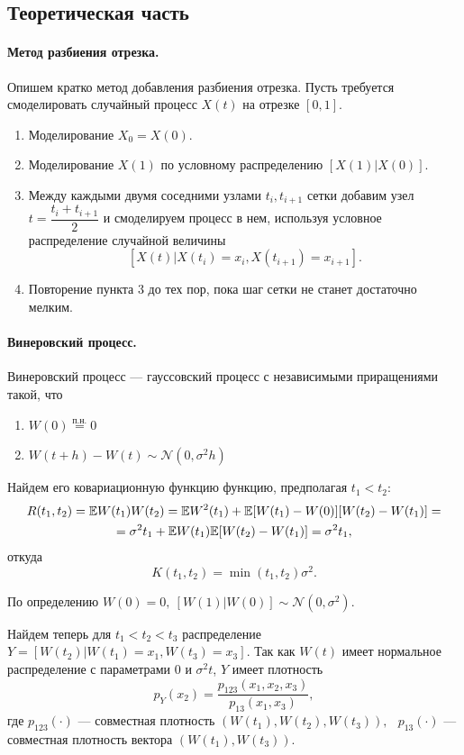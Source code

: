 \documentclass[16pt]{article}
\newcommand\A{(\cdot)}
\begin{document}
\subsection{Теоретическая часть}
\paragraph{Метод разбиения отрезка.}
Опишем кратко метод добавления разбиения отрезка. Пусть требуется смоделировать случайный процесс $X(t)$ на отрезке $[0, 1]$. 
\begin{enumerate}
	\item Моделирование $X_0 = X(0)$.
	\item Моделирование $X(1)$ по условному распределению $[X(1)|X(0)]$.
	\item Между каждыми двумя соседними узлами $t_i, t_{i + 1}$ сетки добавим узел $t = \dfrac{t_i + t_{i+1}}{2}$ и смоделируем процесс в нем, используя условное распределение случайной величины $$[X(t)|X(t_{i}) = x_i, X(t_{i+1}) = x_{i+1}].$$
	\item Повторение пункта 3 до тех пор, пока шаг сетки не станет достаточно мелким.
\end{enumerate}

\paragraph{Винеровский процесс.}
Винеровский процесс --- гауссовский процесс с независимыми приращениями такой, что
\begin{enumerate}
	\item $W(0) \overset{\text{п.н.}}{=} 0$
	\item $W(t + h) - W(t) \sim \mathcal{N}(0, \sigma^2h)$
\end{enumerate}

Найдем его ковариационную функцию функцию, предполагая $t_1 < t_2$:
\begin{multline}\notag
 R(t_1, t_2) = \mathbb{E}W(t_1)W(t_2) = \mathbb{E}W^2(t_1) + \mathbb{E}[W(t_1) - W(0)][W(t_2) - W(t_1)] =\\= \sigma^2 t_1 + \mathbb{E}W(t_1)\mathbb{E}[W(t_2) - W(t_1)] = \sigma^2 t_1,
\end{multline}
откуда
$$K(t_1, t_2) = \min(t_1, t_2) \sigma^2.$$

По определению $W(0) = 0, \ [W(1)|W(0)] \sim \mathcal{N}(0, \sigma^2)$. 

Найдем теперь для $t_1 < t_2 < t_3$ распределение $Y = [W(t_2)|W(t_1) = x_1, W(t_3) = x_3]$. 
Так как $W(t)$ имеет нормальное распределение с параметрами $0$ и $\sigma^2t$, $Y$ имеет плотность
$$p_Y(x_2) = \dfrac{p_{123}(x_1, x_2, x_3)}{p_{13}(x_1, x_3)},$$
где $p_{123}\A$ --- совместная плотность $(W(t_1), W(t_2), W(t_3)),\ $\ $p_{13}\A$ --- совместная плотность вектора $(W(t_1), W(t_3))$.
\end{document}
